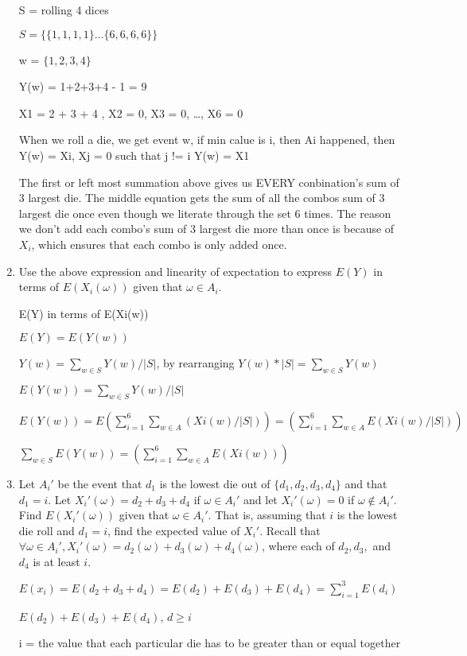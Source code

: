 \documentclass[12pt]{article}
\newcounter{ques}
\newenvironment{question}{\stepcounter{ques}{\noindent\bf Question \arabic{ques}:}}{\vspace{5mm}}
\begin{document}
\begin{question}
\begin{enumerate}
		S = rolling 4 dices

		$S = \{ \{1,1,1,1\} \dots \{6,6,6,6\} \}$

		w = $\{1,2,3,4\}$
		
		Y(w) = 1+2+3+4 - 1 = 9

		X1 = 2 + 3 + 4 , X2 = 0, X3 = 0, \dots, X6 = 0

		When we roll a die, we get event w, if min calue is i, then Ai happened, then Y(w) = Xi, Xj = 0 such that j != i
		Y(w) = X1

		The first or left most summation above gives us EVERY conbination's sum of 3 largest die.
		The middle equation gets the sum of all the combos sum of 3 largest die once even though we literate through the set 6 times.
		The reason we don't add each combo's sum of 3 largest die more than once is because of $X_i$, which ensures that each combo is only added once.


		\item Use the above expression and linearity of expectation to express $E(Y)$ in terms of $E(X_i(\omega))$ given that $\omega \in A_i$. 
		
		E(Y) in terms of E(Xi(w))

		$E(Y) = E(Y(w))$

		$Y(w) = \sum_{w \in S} Y(w) / |S|$, by rearranging $Y(w) * |S| = \sum_{w \in S} Y(w)$

		$E(Y(w)) = \sum_{w \in S} Y(w) / |S|$

		$E(Y(w)) = E(\sum_{i=1}^{6} \sum_{w \in A} (Xi(w) /|S|)) = (\sum_{i=1}^{6} \sum_{w \in A} E(Xi(w) /|S|))$

		$\sum_{w \in S} E(Y(w)) = (\sum_{i=1}^{6} \sum_{w \in A} E(Xi(w)))$
		
		
		\item Let $A_i'$ be the event that $d_1$ is the lowest die out of $\{d_1,d_2,d_3,d_4\}$ and that $d_1 = i$. Let  $X_i'(\omega)=d_2+d_3+d_4$ if $\omega \in A_i'$ and let $X_i'(\omega)=0$ if $\omega \notin A_i'$. Find  $E(X_i'(\omega))$ given that $\omega \in A_i'$. That is, assuming that $i$ is the lowest die roll and $d_1 = i$, find the expected value of $X_i'$. Recall that $\forall \omega \in A_i', X_i'(\omega) = d_2(\omega)+d_3(\omega)+d_4(\omega)$, where each of $d_2,d_3,$ and $d_4$ is at least $i$.
	
		$E(x_i) = E(d_2 + d_3 + d_4) = E(d_2) + E(d_3) + E(d_4) = \sum_{i = 1}^{3} E(d_i)$

		$E(d_2) + E(d_3) + E(d_4)$, $d \geq i$

		i = the value that each particular die has to be greater than or equal together


\end{enumerate}
\end{question}
\end{document}
